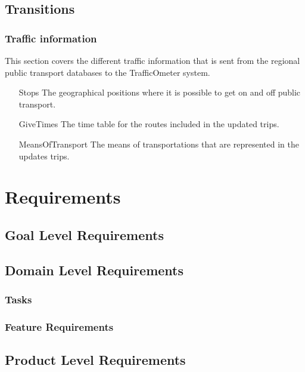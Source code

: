 \documentclass[a4paper]{article}
\begin{document}
		\subsection{Transitions} %
		\label{sub:transitions}
			\subsubsection{Traffic information} %
			\label{ssub:traffic_information}
			This section covers the different traffic information that is sent from the regional public transport databases to the TrafficOmeter system.
			\begin{itemize}
				\item[Stops] The geographical positions where it is possible to get on and off public transport.
				\item[GiveTimes] The time table for the routes included in the updated trips.
				\item[MeansOfTransport] The means of transportations that are represented in the updates trips.
			\end{itemize}
		
	
	
	\section{Requirements}
		\subsection{Goal Level Requirements}
			
		\subsection{Domain Level Requirements}
			\subsubsection{Tasks}
				
			\subsubsection{Feature Requirements}

								
		
		\pagebreak		
	
		\subsection{Product Level Requirements}		
\end{document}
